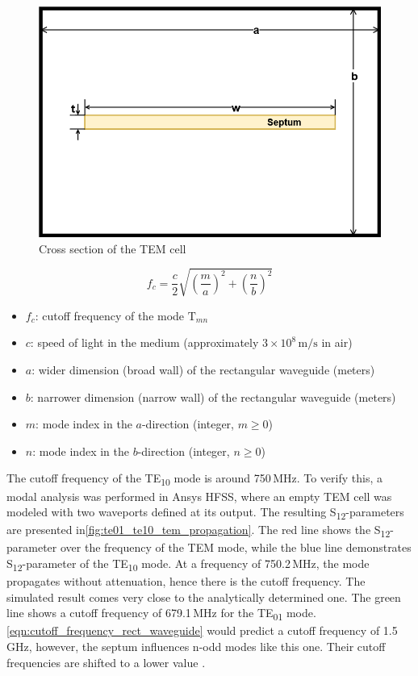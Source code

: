 \begin{figure}[h]
    \centering
    \includegraphics[width=0.5\linewidth]{Documentation//content//10_theory//img/tem_cell_crosssection.png}
    \caption{Cross section of the TEM cell}
    \label{fig:tem_cell_crosssection}
\end{figure}

\begin{equation}
    f_c = \frac{c}{2} \sqrt{\left(\frac{m}{a}\right)^2 + \left(\frac{n}{b}\right)^2}
    \label{eqn:cutoff_frequency_rect_waveguide}
\end{equation}

\begin{itemize}
  \item \( f_c \): cutoff frequency of the mode \(\text{T}_{mn}\)
  \item \( c \): speed of light in the medium (approximately \(3 \times 10^8 \, \text{m/s}\) in air)
  \item \( a \): wider dimension (broad wall) of the rectangular waveguide (meters)
  \item \( b \): narrower dimension (narrow wall) of the rectangular waveguide (meters)
  \item \( m \): mode index in the \(a\)-direction (integer, \(m \geq 0\))
  \item \( n \): mode index in the \(b\)-direction (integer, \(n \geq 0\))
\end{itemize}

The cutoff frequency of the TE\textsubscript{10} mode is around 750\,MHz. To verify this, a modal analysis was performed in Ansys HFSS, where an empty TEM cell was modeled with two waveports defined at its output. The resulting S\textsubscript{12}-parameters are presented in\autoref{fig:te01_te10_tem_propagation}. The red line shows the S\textsubscript{12}-parameter over the frequency of the TEM mode, while the blue line demonstrates S\textsubscript{12}-parameter of the TE\textsubscript{10} mode. At a frequency of 750.2\,MHz, the mode propagates without attenuation, hence there is the cutoff frequency. The simulated result comes very close to the analytically determined one. The green line shows a cutoff frequency of 679.1\,MHz for the TE\textsubscript{01} mode. \autoref{eqn:cutoff_frequency_rect_waveguide} would predict a cutoff frequency of 1.5\,GHz, however, the septum influences n-odd modes like this one. Their cutoff frequencies are shifted to a lower value \cite{Weil_Gruner_1984}. 

